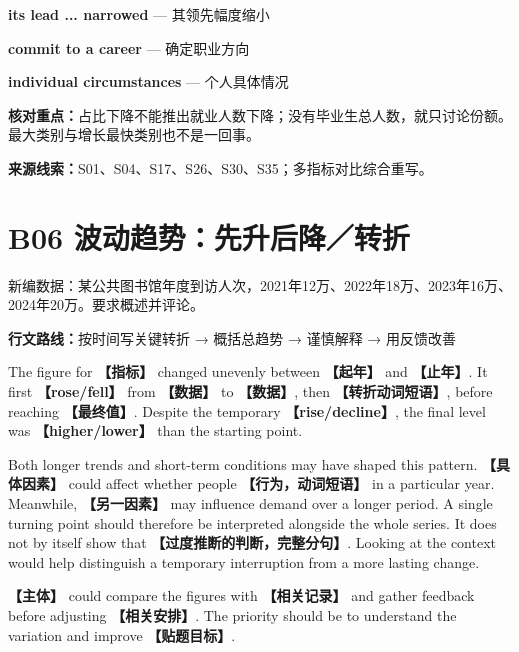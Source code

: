 \documentclass[11pt,a4paper,fontset=macnew]{ctexart}
\newenvironment{writing}{\begingroup\fontsize{10.5}{13.5}\selectfont\setlength{\parskip}{3pt}}{\par\endgroup}
\begin{document}
\par\vspace{4pt}{\bfseries 好词好句：优先记这三处}\par\nopagebreak
{\small\textbf{its lead ... narrowed} — 其领先幅度缩小}\par
{\small\textbf{commit to a career} — 确定职业方向}\par
{\small\textbf{individual circumstances} — 个人具体情况}\par
{\small\textbf{核对重点：}占比下降不能推出就业人数下降；没有毕业生总人数，就只讨论份额。最大类别与增长最快类别也不是一回事。}\par
{\fontsize{8}{10}\selectfont\textbf{来源线索：}S01、S04、S17、S26、S30、S35；多指标对比综合重写。}\par
\clearpage\section*{B06  波动趋势：先升后降／转折}
{\small 新编数据：某公共图书馆年度到访人次，2021年12万、2022年18万、2023年16万、2024年20万。要求概述并评论。}\par
{\small\textbf{行文路线：}按时间写关键转折 → 概括总趋势 → 谨慎解释 → 用反馈改善}\par
\par\vspace{4pt}{\bfseries 可替换模板}\par\nopagebreak
\begin{writing}
The figure for {\bfseries 【指标】} changed unevenly between {\bfseries 【起年】} and {\bfseries 【止年】}. It first {\bfseries 【rose/fell】} from {\bfseries 【数据】} to {\bfseries 【数据】}, then {\bfseries 【转折动词短语】}, before reaching {\bfseries 【最终值】}. Despite the temporary {\bfseries 【rise/decline】}, the final level was {\bfseries 【higher/lower】} than the starting point.

Both longer trends and short-term conditions may have shaped this pattern. {\bfseries 【具体因素】} could affect whether people {\bfseries 【行为，动词短语】} in a particular year. Meanwhile, {\bfseries 【另一因素】} may influence demand over a longer period. A single turning point should therefore be interpreted alongside the whole series. It does not by itself show that {\bfseries 【过度推断的判断，完整分句】}. Looking at the context would help distinguish a temporary interruption from a more lasting change.

{\bfseries 【主体】} could compare the figures with {\bfseries 【相关记录】} and gather feedback before adjusting {\bfseries 【相关安排】}. The priority should be to understand the variation and improve {\bfseries 【贴题目标】}.

\end{writing}
\end{document}
